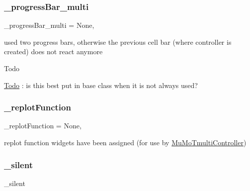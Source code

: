 \subsubsection{\texorpdfstring{\+\_\+progress\+Bar\+\_\+multi}{\_progressBar\_multi}}
{\footnotesize\ttfamily \+\_\+progress\+Bar\+\_\+multi = None\hspace{0.3cm}{\ttfamily [static]}, {\ttfamily [private]}}



used two progress bars, otherwise the previous cell bar (where controller is created) does not react anymore 

\begin{DoxyRefDesc}{Todo}
\item[\hyperlink{todo__todo000019}{Todo}]\+: is this best put in base class when it is not always used? \end{DoxyRefDesc}
\mbox{\label{class_mu_mo_t_1_1_mu_mo_tcontroller_a04e66f2b7e3c67b0e96f318acbfa7f0e}} 
\subsubsection{\texorpdfstring{\+\_\+replot\+Function}{\_replotFunction}}
{\footnotesize\ttfamily \+\_\+replot\+Function = None\hspace{0.3cm}{\ttfamily [static]}, {\ttfamily [private]}}



replot function widgets have been assigned (for use by \hyperlink{class_mu_mo_t_1_1_mu_mo_tmulti_controller}{Mu\+Mo\+Tmulti\+Controller}) 

\mbox{\label{class_mu_mo_t_1_1_mu_mo_tcontroller_a909146a3c119c927727c7d533042b184}} 
\subsubsection{\texorpdfstring{\+\_\+silent}{\_silent}}
{\footnotesize\ttfamily \+\_\+silent\hspace{0.3cm}{\ttfamily [private]}}

